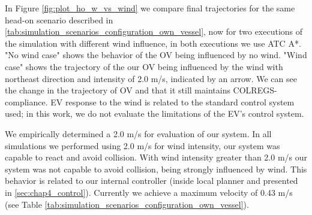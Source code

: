         In Figure \ref{fig:plot_ho_w_vs_wind} we compare final trajectories for the same head-on scenario described in \ref{tab:simulation_scenarios_configuration_own_vessel}, now for two executions of the simulation with different wind influence, in both executions we use \ac{ATC} A*. "No wind case" shows the behavior of the \ac{OV} being influenced by no wind. "Wind case" shows the trajectory of the our \ac{OV} being influenced by the wind with northeast direction and intensity of 2.0 m/s, 
        indicated by an arrow. We can see the change in the trajectory of \ac{OV} and that it still maintains COLREGS-compliance. 
        \ac{EV} response to the wind is related to the standard control system used; in this work, we do not evaluate the limitations of the \ac{EV}'s control system.

        We empirically determined a 2.0 m/s for evaluation of our system. In all simulations we performed using 2.0 m/s for wind intensity, our system was capable to react and avoid collision. With wind intensity greater than 2.0 m/s our system was not capable to avoid collision, being strongly influenced by wind. This behavior is related to our internal controller (inside local planner and presented in \ref{sec:chap4_control}). Currently we achieve a maximum velocity of 0.43 m/s (see Table \ref{tab:simulation_scenarios_configuration_own_vessel}). 
        
